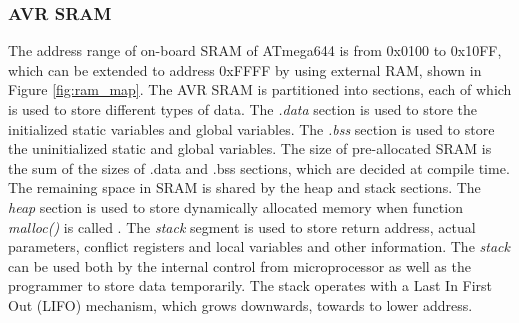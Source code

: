 \subsubsection{AVR SRAM}
The address range of on-board SRAM of ATmega644 is from 0x0100 to 0x10FF, which can be extended to address 0xFFFF by using external RAM, shown in Figure \ref{fig:ram_map}. 
The AVR SRAM is partitioned into sections, each of which is used to store different types of data. The \textit{.data} section is used to store the initialized static variables and global variables. The \textit{.bss} section is used to store the uninitialized static and global variables. The size of pre-allocated SRAM is the sum of the sizes of .data and .bss sections, which are decided at compile time. The remaining space in SRAM is shared by the heap and stack sections. The \textit{heap} section is used to store dynamically allocated memory when function \textit{malloc()} is called \cite{goldt1995linux}. The \textit{stack} segment is used to store return address, actual parameters, conflict registers and local variables and other information. The \textit{stack} can be used both by the internal control from microprocessor as well as the programmer to store data temporarily. The stack operates with a Last In First Out (LIFO) mechanism, which grows downwards, towards to lower address.

